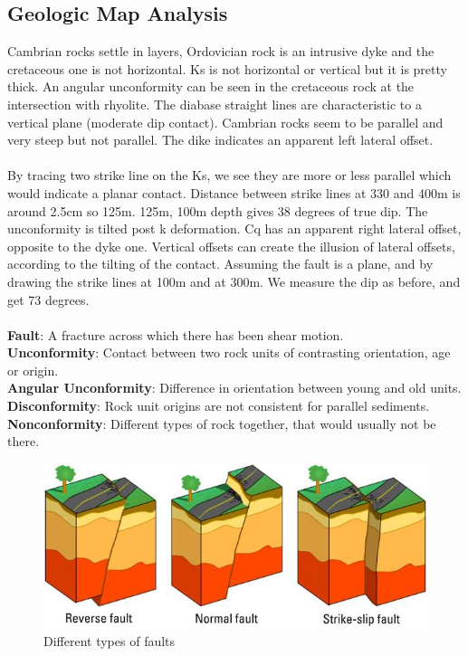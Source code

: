 \documentclass[12pt,a4paper]{report}
\begin{document}
\subsection*{Geologic Map Analysis}
Cambrian rocks settle in layers, Ordovician rock is an intrusive dyke and the cretaceous one is not horizontal.
Ks is not horizontal or vertical but it is pretty thick. An angular unconformity can be seen in the cretaceous rock at the intersection with rhyolite.
The diabase straight lines are characteristic to a vertical plane (moderate dip contact).
Cambrian rocks seem to be parallel and very steep but not parallel.
The dike indicates an apparent left lateral offset.\\
\\
By tracing two strike line on the Ks, we see they are more or less parallel which would indicate a planar contact.
Distance between strike lines at 330 and 400m is around 2.5cm so 125m.
125m, 100m depth gives 38 degrees of true dip.
The unconformity is tilted post k deformation.
Cq has an apparent right lateral offset, opposite to the dyke one.
Vertical offsets can create the illusion of lateral offsets, according to the tilting of the contact.
Assuming the fault is a plane, and by drawing the strike lines at 100m and at 300m.
We measure the dip as before, and get 73 degrees.\\
\\
\textbf{Fault}: A fracture across which there has been shear motion.\\
\textbf{Unconformity}: Contact between two rock units of contrasting orientation, age or origin.\\
\textbf{Angular Unconformity}: Difference in orientation between young and old units.\\
\textbf{Disconformity}: Rock unit origins are not consistent for parallel sediments.\\
\textbf{Nonconformity}: Different types of rock together, that would usually not be there.
\begin{figure}[h]
  \includegraphics[scale=0.50]{types-of-faults.jpg}
  \centering
  \caption{Different types of faults}
\end{figure}
\end{document}

